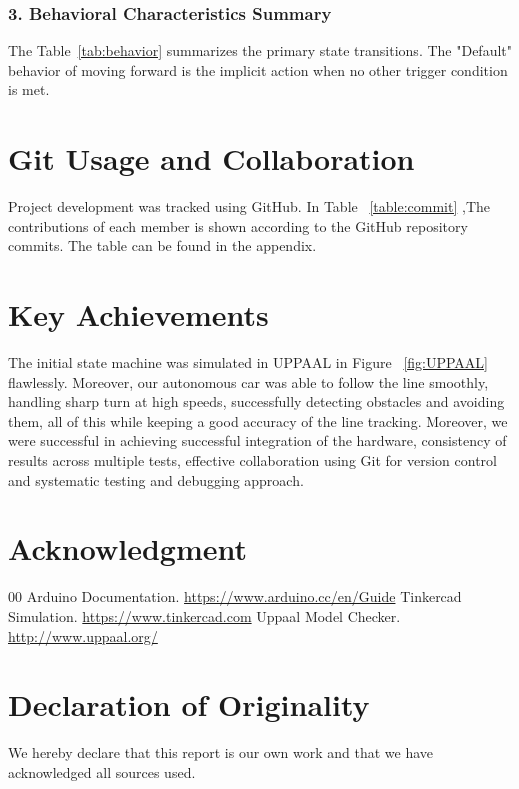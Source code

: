 \documentclass[conference]{IEEEtran}
\begin{document}
\subsubsection*{\textbf{3. Behavioral Characteristics Summary}}

The Table~\ref{tab:behavior} summarizes the primary state transitions. The "Default" behavior of moving forward is the implicit action when no other trigger condition is met.

\section{Git Usage and Collaboration}
Project development was tracked using GitHub. In Table ~\ref{table:commit} ,The contributions of each member is shown according to the GitHub repository commits. The table can be found in the appendix.

\section{Key Achievements}
The initial state machine was simulated in UPPAAL in Figure ~\ref{fig:UPPAAL} flawlessly. Moreover, our autonomous car was able to follow the line smoothly, handling sharp turn at high speeds, successfully detecting obstacles and avoiding them, all of this while keeping a good accuracy of the line tracking. Moreover, we were successful in achieving successful integration of the hardware, consistency of results across multiple tests, effective collaboration using Git for version control and systematic testing and debugging approach.

\section*{Acknowledgment}

\begin{thebibliography}{00}
 Arduino Documentation. \url{https://www.arduino.cc/en/Guide}
 Tinkercad Simulation. \url{https://www.tinkercad.com}
 Uppaal Model Checker. \url{http://www.uppaal.org/}
\end{thebibliography}

\section*{Declaration of Originality}
We hereby declare that this report is our own work and that we have acknowledged all sources used.
\end{document}
